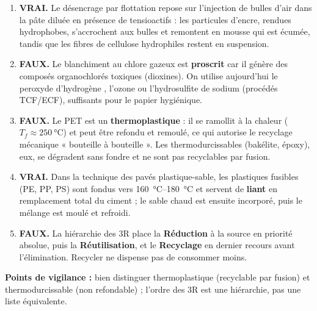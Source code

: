 \documentclass[11pt]{article}
\newcommand{\cle}[1]{{\popxbold\color{popdark}#1}}
\begin{document}
\begin{corrige}
\begin{enumerate}
    \item \textbf{VRAI.} Le \cle{désencrage} par flottation repose sur l'injection de bulles d'air dans la pâte diluée en présence de tensioactifs : les particules d'encre, rendues hydrophobes, s'accrochent aux bulles et remontent en mousse qui est écumée, tandis que les fibres de cellulose hydrophiles restent en suspension.
    \item \textbf{FAUX.} Le blanchiment au chlore gazeux  est \textbf{proscrit} car il génère des composés organochlorés toxiques (dioxines). On utilise aujourd'hui le peroxyde d'hydrogène , l'ozone  ou l'hydrosulfite de sodium (procédés TCF/ECF), suffisants pour le papier hygiénique.
    \item \textbf{FAUX.} Le PET est un \textbf{thermoplastique} : il se ramollit à la chaleur ($T_f \approx \SI{250}{\celsius}$) et peut être refondu et remoulé, ce qui autorise le recyclage mécanique « bouteille à bouteille ». Les thermodurcissables (bakélite, époxy), eux, se dégradent sans fondre et ne sont pas recyclables par fusion.
    \item \textbf{VRAI.} Dans la technique des pavés plastique-sable, les plastiques fusibles (PE, PP, PS) sont fondus vers \SI{160}{\celsius}--\SI{180}{\celsius} et servent de \textbf{liant} en remplacement total du ciment ; le sable chaud est ensuite incorporé, puis le mélange est moulé et refroidi.
    \item \textbf{FAUX.} La hiérarchie des 3R place la \textbf{Réduction} à la source en priorité absolue, puis la \textbf{Réutilisation}, et le \textbf{Recyclage} en dernier recours avant l'élimination. Recycler ne dispense pas de consommer moins.
\end{enumerate}

\textbf{Points de vigilance :} bien distinguer thermoplastique (recyclable par fusion) et thermodurcissable (non refondable) ; l'ordre des 3R est une hiérarchie, pas une liste équivalente.
\end{corrige}
\end{document}
